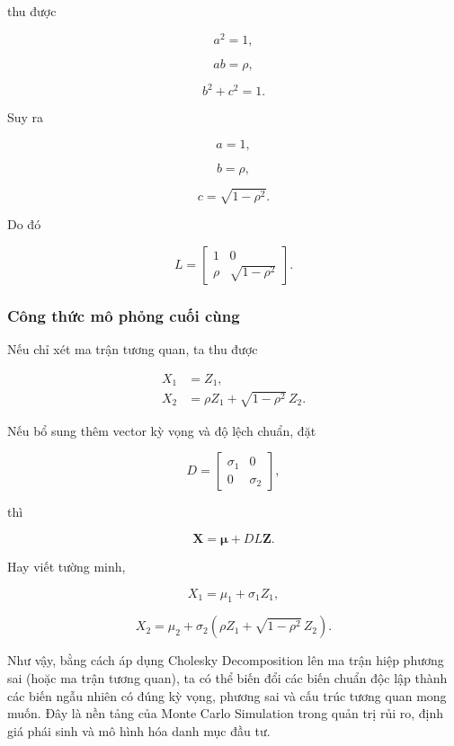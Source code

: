 thu được

\[
a^2=1,
\]

\[
ab=\rho,
\]

\[
b^2+c^2=1.
\]

Suy ra

\[
a=1,
\]

\[
b=\rho,
\]

\[
c=\sqrt{1-\rho^2}.
\]

Do đó

\[
\boxed{
L
=
\begin{bmatrix}
1&0\\
\rho&\sqrt{1-\rho^2}
\end{bmatrix}.
}
\]

\subsubsection*{Công thức mô phỏng cuối cùng}

Nếu chỉ xét ma trận tương quan, ta thu được

\[
\begin{aligned}
X_1
&=
Z_1,
\\
X_2
&=
\rho Z_1
+
\sqrt{1-\rho^2}\,Z_2.
\end{aligned}
\]

Nếu bổ sung thêm vector kỳ vọng và độ lệch chuẩn, đặt

\[
D=
\begin{bmatrix}
\sigma_1&0\\
0&\sigma_2
\end{bmatrix},
\]

thì

\[
\boxed{
\mathbf X
=
\boldsymbol{\mu}
+
DL\mathbf Z.
}
\]

Hay viết tường minh,

\[
\boxed{
X_1
=
\mu_1+\sigma_1Z_1,
}
\]

\[
\boxed{
X_2
=
\mu_2
+
\sigma_2
\left(
\rho Z_1
+
\sqrt{1-\rho^2}\,Z_2
\right).
}
\]

Như vậy, bằng cách áp dụng Cholesky Decomposition lên ma trận hiệp phương sai (hoặc ma trận tương quan), ta có thể biến đổi các biến chuẩn độc lập thành các biến ngẫu nhiên có đúng kỳ vọng, phương sai và cấu trúc tương quan mong muốn. Đây là nền tảng của Monte Carlo Simulation trong quản trị rủi ro, định giá phái sinh và mô hình hóa danh mục đầu tư.
